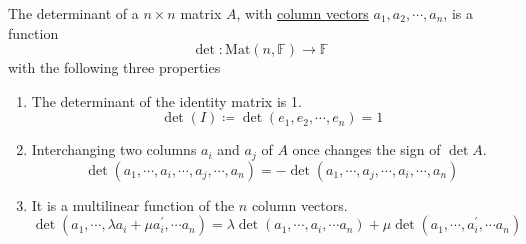   \begin{definition}[Determinant]
    \label{def:determinant}
    The determinant of a $n \times n$ matrix $A$, with \hyperref[def:column-vector]{column vectors} $a_1, a_2, \cdots, a_n$, is a function
    \begin{equation}
      \det: \text{Mat}(n, \mathbb{F}) \to \mathbb{F}
    \end{equation}
    with the following three properties
    \begin{enumerate}
      \item The determinant of the identity matrix is 1. 
      \begin{equation}
        \det{(I)} \coloneqq \det{(e_1, e_2, \cdots, e_n)} = 1
      \end{equation}
      \item Interchanging two columns $a_i$ and $a_j$ of $A$ once changes the sign of $\det{A}$. 
      \begin{equation}
        \det{(a_1, \cdots, a_i, \cdots, a_j, \cdots, a_n)} = -\det{(a_1, \cdots, a_j, \cdots, a_i, \cdots, a_n)}
      \end{equation}
      \item It is a multilinear function of the $n$ column vectors. 
      \begin{equation}
        \det{(a_1, \cdots, \lambda a_i + \mu a_i^\prime, \cdots a_n)} = \lambda \det{(a_1, \cdots, a_i, \cdots a_n)} + \mu \det{(a_1, \cdots, a_i^\prime, \cdots a_n)}
      \end{equation}
    \end{enumerate}
  \end{definition}

